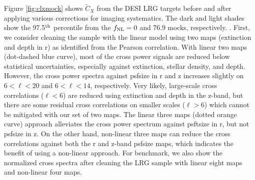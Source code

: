 Figure \ref{fig:clxmock} shows $\tilde{C}_{X}$ from the DESI LRG targets before and after applying various corrections for imaging systematics. The dark and light shades show the 97.5$^{\rm th}$ percentile from the $f_{\rm NL}=0$ and $76.9$ mocks, respectively. . First, we consider cleaning the sample with the linear model using two maps (extinction and depth in r) as identified from the Pearson correlation. With linear two maps (dot-dashed blue curve), most of the cross power signals are reduced below statistical uncertainties, especially against extinction, stellar density, and depth. However, the cross power spectra against psfsize in r and z increases slightly on $6<\ell<20$ and $6<\ell<14$, respectively. Very likely, large-scale cross correlations ($\ell < 6$) are reduced using extinction and depth in the z-band, but there are some residual cross correlations on smaller scales ($\ell > 6$) which cannot be mitigated with our set of two maps. The linear three maps (dotted orange curve) approach alleviates the cross power spectrum against psftsize in r, but not psfsize in z. On the other hand, non-linear three maps can reduce the cross correlations against both the r and z-band psfsize maps, which indicates the benefit of using a non-linear approach. For benchmark, we also show the normalized cross spectra after cleaning the LRG sample with linear eight maps and non-linear four maps. 


